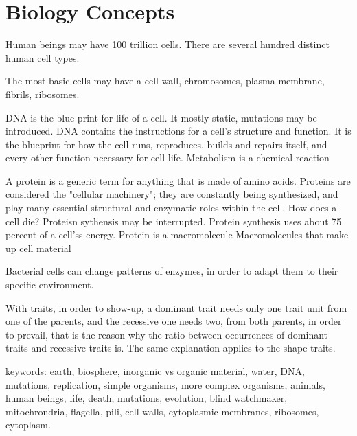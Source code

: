 

\section{Biology Concepts}

Human beings may have 100 trillion cells. There are several hundred distinct
human cell types.

The most basic cells may have a cell wall, chromosomes, plasma membrane,
fibrils, ribosomes.

DNA is the blue print for life of a cell.  It mostly static, mutations may be
introduced.   DNA contains the instructions for a cell's structure and function.
It is the blueprint for how the cell runs, reproduces, builds and repairs
itself, and every other function necessary for cell life.  Metabolism is a
chemical reaction

A protein is a generic term for anything that is made of amino acids.  Proteins
are considered the "cellular machinery"; they are constantly being synthesized, and play many essential structural and enzymatic roles within the
cell.  How does a cell die?  Proteisn sythensis may be interrupted.  Protein
synthesis uses about 75 percent of a cell'ss energy. Protein is a macromolceule
Macromolecules that make up cell material

Bacterial cells can change patterns of enzymes, in order to adapt them to their
specific environment.

With traits,  in order to show-up, a dominant trait needs only one trait unit
from one of the parents, and the recessive one needs two, from both parents, in order to prevail, 
that is the reason why the ratio between occurrences of dominant traits and
recessive traits is. The same explanation applies to the shape traits.

keywords: earth, biosphere, inorganic vs organic material,
water, DNA, mutations, replication, simple organisms, more complex organisms,
animals, human beings, life, death, mutations, evolution, blind
watchmaker, mitochrondria, flagella, pili, cell walls, cytoplasmic membranes,
ribosomes, cytoplasm.
